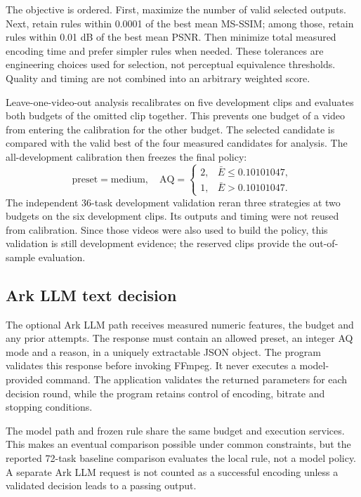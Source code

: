 \documentclass[conference]{IEEEtran}
\begin{document}
The objective is ordered. First, maximize the number of valid selected outputs. Next, retain rules within 0.0001 of the best mean MS-SSIM; among those, retain rules within 0.01 dB of the best mean PSNR. Then minimize total measured encoding time and prefer simpler rules when needed. These tolerances are engineering choices used for selection, not perceptual equivalence thresholds. Quality and timing are not combined into an arbitrary weighted score.

Leave-one-video-out analysis recalibrates on five development clips and evaluates both budgets of the omitted clip together. This prevents one budget of a video from entering the calibration for the other budget. The selected candidate is compared with the valid best of the four measured candidates for analysis. The all-development calibration then freezes the final policy:
\begin{equation}
\text{preset}=\text{medium},\quad
\text{AQ}=\begin{cases}2,& \bar{E}\leq0.10101047,\\1,& \bar{E}>0.10101047.\end{cases}
\end{equation}
The independent 36-task development validation reran three strategies at two budgets on the six development clips. Its outputs and timing were not reused from calibration. Since those videos were also used to build the policy, this validation is still development evidence; the reserved clips provide the out-of-sample evaluation.

\subsection{Ark LLM text decision}
The optional Ark LLM path receives measured numeric features, the budget and any prior attempts. The response must contain an allowed preset, an integer AQ mode and a reason, in a uniquely extractable JSON object. The program validates this response before invoking FFmpeg. It never executes a model-provided command. The application validates the returned parameters for each decision round, while the program retains control of encoding, bitrate and stopping conditions.

The model path and frozen rule share the same budget and execution services. This makes an eventual comparison possible under common constraints, but the reported 72-task baseline comparison evaluates the local rule, not a model policy. A separate Ark LLM request is not counted as a successful encoding unless a validated decision leads to a passing output.
\end{document}
